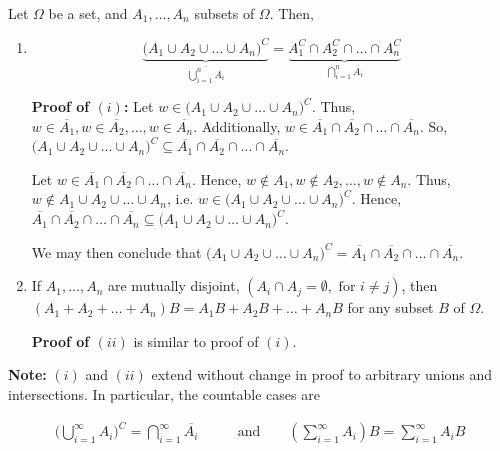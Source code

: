 \documentclass[12pt]{article}
\begin{document}
\noindent
Let $\Omega$ be a set, and $A_1, \ldots, A_n$ subsets of $\Omega$. Then, 
\begin{enumerate}[label=(\roman*)]
\item 
\begin{equation*}
\underbrace{\big ( A_1 \cup A_2 \cup \ldots \cup A_n \big )^C}_{\overline{\bigcup\limits_{i=1}^{n} A_i}} = \underbrace{ A_1^C \cap A_2^C \cap \ldots \cap A_n^C }_{\bigcap\limits_{i=1}^{n} \overline{A_i}}
\end{equation*}

\begin{adjustwidth}{2.5em}{0pt}
\textbf{Proof of $(i)$:} Let $w \in \big ( A_1 \cup A_2 \cup \ldots \cup A_n \big )^C$. Thus, $w \in \overline{A_1}, w \in \overline{A_2}, \ldots, w \in \overline{A_n}$. Additionally, $w \in \overline{A_1} \cap \overline{A_2} \cap \ldots \cap \overline{A_n}$. So, $\big ( A_1 \cup A_2 \cup \ldots \cup A_n \big )^C \subseteq \overline{A_1} \cap \overline{A_2} \cap \ldots \cap \overline{A_n}$. 

Let $w \in \overline{A_1} \cap \overline{A_2} \cap \ldots \cap \overline{A_n}$. Hence, $w \not \in A_1, w \not \in A_2, \ldots, w \not \in A_n$. Thus, $w \not \in A_1 \cup A_2 \cup \ldots \cup A_n$, i.e. $w \in \big ( A_1 \cup A_2 \cup \ldots \cup A_n \big )^C$. Hence, $\overline{A_1} \cap \overline{A_2} \cap \ldots \cap \overline{A_n} \subseteq \big ( A_1 \cup A_2 \cup \ldots \cup A_n \big )^C$. 

We may then conclude that $\big ( A_1 \cup A_2 \cup \ldots \cup A_n \big )^C = \overline{A_1} \cap \overline{A_2} \cap \ldots \cap \overline{A_n}$. 
\end{adjustwidth}

\item If $A_1, \ldots, A_n$ are mutually disjoint, $(A_i \cap A_j =\emptyset, \text{ for } i \neq j)$, then $(A_1+A_2+\ldots+A_n)B=A_1B+A_2B+\ldots+A_nB$ for any subset $B$ of $\Omega$.

\begin{adjustwidth}{2.5em}{0pt}
\textbf{Proof of $(ii)$} is similar to proof of $(i)$.
\end{adjustwidth}

\end{enumerate}

\noindent
\textbf{Note:} $(i)$ and $(ii)$ extend without change in proof to arbitrary unions and intersections. In particular, the countable cases are

\begin{align*}
\Big ( \bigcup\limits_{i=1}^{\infty} A_i \Big )^C = \bigcap\limits_{i=1}^{\infty} \overline{A_i} & \qquad \text{and} \qquad (\sum_{i=1}^{\infty}A_i)B = \sum_{i=1}^{\infty} A_iB \\
\end{align*}
\end{document}
